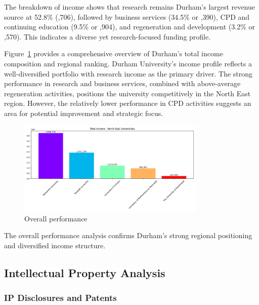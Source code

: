 \documentclass[journal,onecolumn, 10pt,draftclsnofoot]{IEEEtran}
\begin{document}
The breakdown of income shows that research remains Durham's largest revenue source at 52.8\% (,706), followed by business services (34.5\% or ,390), CPD and continuing education (9.5\% or ,904), and regeneration and development (3.2\% or ,570). This indicates a diverse yet research-focused funding profile.

Figure~\ref{fig:overall-performance} provides a comprehensive overview of Durham's total income composition and regional ranking. Durham University's income profile reflects a well-diversified portfolio with research income as the primary driver. The strong performance in research and business services, combined with above-average regeneration activities, positions the university competitively in the North East region. However, the relatively lower performance in CPD activities suggests an area for potential improvement and strategic focus.

\begin{figure}[h]
\centering
\includegraphics[width=0.8\textwidth]{Fig/figure17._overall_performance.png}
\caption{Overall performance}
\label{fig:overall-performance}
\end{figure}

The overall performance analysis confirms Durham's strong regional positioning and diversified income structure.

\subsection{Intellectual Property Analysis}

\subsubsection{IP Disclosures and Patents}
\end{document}
